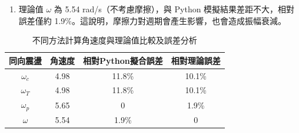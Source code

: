 \documentclass[12pt]{article}
\begin{document}
\begin{enumerate}
\begin{enumerate}
    \item 理論值 $\omega$ 為 5.54 rad/s（不考慮摩擦），與 Python 模擬結果差距不大，相對誤差僅約 1.9\%。這說明，摩擦力對週期會產生影響，也會造成振幅衰減。
    \end{enumerate}
    \begin{table}[H]
    \centering
    \caption{不同方法計算角速度與理論值比較及誤差分析}
    \label{tab:angular_velocity}
    \begin{tabular}{@{}cccc@{}}
    \toprule
    同向震盪    & 角速度  & 相對Python擬合誤差 & 相對理論誤差 \\ \midrule
    $\omega_c$ & 4.98 & 11.8\%       & 10.1\%  \\
    $\omega_T$ & 4.98 & 11.8\%       & 10.1\% \\
    $\omega_p$ & 5.65 & 0            & 1.9\%  \\
    $\omega$   & 5.54 & 1.9\%        & 0      \\ \bottomrule
    \end{tabular}
    \end{table}
\end{enumerate}
\newpage
\end{document}
